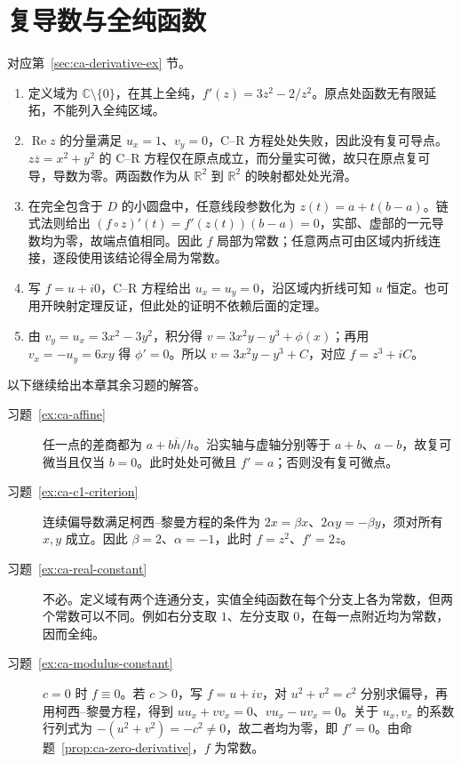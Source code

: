 \section{复导数与全纯函数}
对应第~\ref{sec:ca-derivative-ex} 节。
\begin{enumerate}
 \item 定义域为 $\mathbb C\setminus\{0\}$，在其上全纯，$f'(z)=3z^2-2/z^2$。原点处函数无有限延拓，不能列入全纯区域。
 \item $\operatorname{Re}z$ 的分量满足 $u_x=1$、$v_y=0$，C--R 方程处处失败，因此没有复可导点。$z\overline z=x^2+y^2$ 的 C--R 方程仅在原点成立，而分量实可微，故只在原点复可导，导数为零。两函数作为从 $\mathbb R^2$ 到 $\mathbb R^2$ 的映射都处处光滑。
 \item 在完全包含于 $D$ 的小圆盘中，任意线段参数化为 $z(t)=a+t(b-a)$。链式法则给出 $(f\circ z)'(t)=f'(z(t))(b-a)=0$，实部、虚部的一元导数均为零，故端点值相同。因此 $f$ 局部为常数；任意两点可由区域内折线连接，逐段使用该结论得全局为常数。
 \item 写 $f=u+i0$，C--R 方程给出 $u_x=u_y=0$，沿区域内折线可知 $u$ 恒定。也可用开映射定理反证，但此处的证明不依赖后面的定理。
 \item 由 $v_y=u_x=3x^2-3y^2$，积分得 $v=3x^2y-y^3+\phi(x)$；再用 $v_x=-u_y=6xy$ 得 $\phi'=0$。所以 $v=3x^2y-y^3+C$，对应 $f=z^3+iC$。
\end{enumerate}

以下继续给出本章其余习题的解答。
\begin{description}
 \item[习题~\ref{ex:ca-affine}]
 任一点的差商都为 $a+b\overline h/h$。沿实轴与虚轴分别等于 $a+b$、$a-b$，故复可微当且仅当 $b=0$。此时处处可微且 $f'=a$；否则没有复可微点。
 \item[习题~\ref{ex:ca-c1-criterion}]
 连续偏导数满足柯西--黎曼方程的条件为 $2x=\beta x$、$2\alpha y=-\beta y$，须对所有 $x,y$ 成立。因此 $\beta=2$、$\alpha=-1$，此时 $f=z^2$、$f'=2z$。
 \item[习题~\ref{ex:ca-real-constant}]
 不必。定义域有两个连通分支，实值全纯函数在每个分支上各为常数，但两个常数可以不同。例如右分支取 $1$、左分支取 $0$，在每一点附近均为常数，因而全纯。
 \item[习题~\ref{ex:ca-modulus-constant}]
 $c=0$ 时 $f\equiv0$。若 $c>0$，写 $f=u+iv$，对 $u^2+v^2=c^2$ 分别求偏导，再用柯西--黎曼方程，得到 $u u_x+v v_x=0$、$v u_x-u v_x=0$。关于 $u_x,v_x$ 的系数行列式为 $-(u^2+v^2)=-c^2\ne0$，故二者均为零，即 $f'=0$。由命题~\ref{prop:ca-zero-derivative}，$f$ 为常数。
\end{description}



